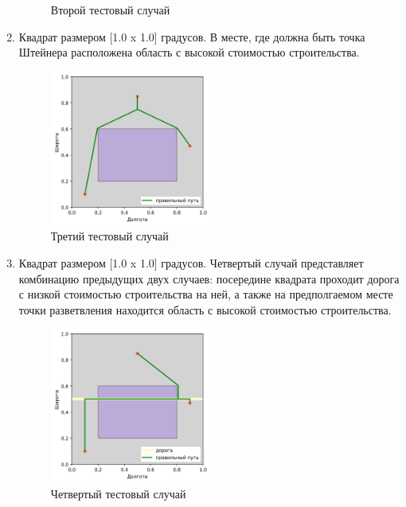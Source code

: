 \begin{enumerate}
{\begin{figure}[H]
			\caption{Второй тестовый случай}
			\label{pic:steiner_case_2}
		\end{figure}
		\vspace{2mm}
	}
	\item {
		Квадрат размером [1.0 x 1.0] градусов. В месте, где должна быть точка Штейнера расположена область с высокой стоимостью строительства.
		\begin{figure}[H]
			\includegraphics[width=0.5\textwidth]{images/4_6.png}
			\caption{Третий тестовый случай}
			\label{pic:steiner_case_3}
		\end{figure}
		\vspace{2mm}
	}
	\item {
		Квадрат размером [1.0 x 1.0] градусов. Четвертый случай представляет комбинацию предыдущих двух случаев: посередине квадрата проходит дорога с низкой стоимостью строительства на ней, а также на предполгаемом месте точки разветвления находится область с высокой стоимостью строительства.
		\begin{figure}[H]
			\includegraphics[width=0.5\textwidth]{images/4_7.png}
			\caption{Четвертый тестовый случай}
			\label{pic:steiner_case_4}
		\end{figure}
		\vspace{2mm}
	}
\end{enumerate}

